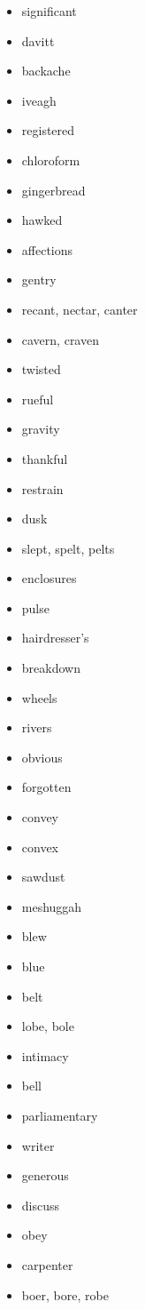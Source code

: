 \documentclass{article}
\begin{document}
\begin{itemize}
    \item significant
    \item davitt
    \item backache
    \item iveagh
    \item registered
    \item chloroform
    \item gingerbread
    \item hawked
    \item affections
    \item gentry
    \item recant, nectar, canter
    \item cavern, craven
    \item twisted
    \item rueful
    \item gravity
    \item thankful
    \item restrain
    \item dusk
    \item slept, spelt, pelts
    \item enclosures
    \item pulse
    \item hairdresser's
    \item breakdown
    \item wheels
    \item rivers
    \item obvious
    \item forgotten
    \item convey
    \item convex
    \item sawdust
    \item meshuggah
    \item blew
    \item blue
    \item belt
    \item lobe, bole
    \item intimacy
    \item bell
    \item parliamentary
    \item writer
    \item generous
    \item discuss
    \item obey
    \item carpenter
    \item boer, bore, robe

\end{itemize}
\end{document}
